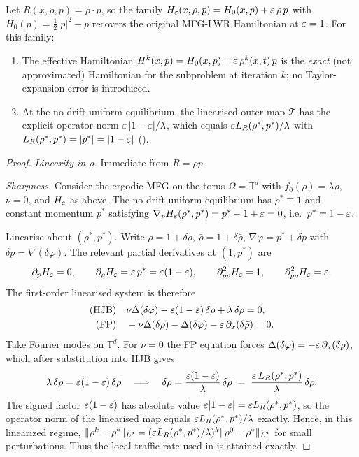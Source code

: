 \begin{proposition}
\label{prop:bilinear_exact}
Let $R(x,\rho,p) = \rho\cdot p$, so the family
$H_\varepsilon(x,\rho,p) = H_0(x,p) + \varepsilon\,\rho\, p$ with
$H_0(p) = \tfrac{1}{2}|p|^2 - p$ recovers the original MFG-LWR Hamiltonian
at $\varepsilon = 1$.  For this family:
\begin{enumerate}
  \item The effective Hamiltonian
        $H^k(x,p) = H_0(x,p) + \varepsilon\,\rho^k(x,t)\,p$
        is the \emph{exact} (not approximated) Hamiltonian for the
        subproblem at iteration $k$; no Taylor-expansion error is
        introduced.
  \item At the no-drift uniform equilibrium, the linearised outer map
        $\mathcal{T}$ has the explicit operator norm
        $\varepsilon\,|1-\varepsilon|/\lambda$, which equals
        $\varepsilon L_R(\rho^*,p^*)/\lambda$ with
        $L_R(\rho^*,p^*) = |p^*| = |1-\varepsilon|$ ().
\end{enumerate}
\end{proposition}
\begin{proof}
\textit{Linearity in $\rho$.} Immediate from $R = \rho p$.

\textit{Sharpness.}  Consider the ergodic MFG on the torus
$\Omega = \mathbb{T}^d$ with $f_0(\rho) = \lambda\rho$, $\nu = 0$, and
$H_\varepsilon$ as above.  The no-drift uniform equilibrium has
$\rho^* \equiv 1$ and constant momentum $p^*$ satisfying
$\nabla_p H_\varepsilon(\rho^*,p^*) = p^* - 1 + \varepsilon = 0$, i.e.\ $p^* = 1 - \varepsilon$.

Linearise about $(\rho^*,p^*)$.  Write $\rho = 1+\delta\rho$,
$\bar\rho = 1+\delta\bar\rho$, $\nabla\varphi = p^* + \delta p$ with
$\delta p = \nabla(\delta\varphi)$.  The relevant partial derivatives at
$(1,p^*)$ are
\[
  \partial_p H_\varepsilon = 0,\qquad
  \partial_\rho H_\varepsilon = \varepsilon\,p^* = \varepsilon(1-\varepsilon),\qquad
  \partial_{pp}^2 H_\varepsilon = 1,\qquad
  \partial_{p\rho}^2 H_\varepsilon = \varepsilon.
\]
The first-order linearised system is therefore
\begin{align*}
  \text{(HJB)}\quad &
  \nu\Delta(\delta\varphi) - \varepsilon(1-\varepsilon)\,\delta\bar\rho
  + \lambda\,\delta\rho = 0, \\
  \text{(FP)}\quad &
  -\nu\Delta(\delta\rho) - \Delta(\delta\varphi)
  - \varepsilon\,\partial_x(\delta\bar\rho) = 0.
\end{align*}
Take Fourier modes on $\mathbb{T}^d$.  For $\nu = 0$ the FP equation
forces $\Delta(\delta\varphi) = -\varepsilon\,\partial_x(\delta\bar\rho)$,
which after substitution into HJB gives
\[
  \lambda\,\delta\rho = \varepsilon(1-\varepsilon)\,\delta\bar\rho
  \quad\Longrightarrow\quad
  \delta\rho = \frac{\varepsilon(1-\varepsilon)}{\lambda}\,\delta\bar\rho
  \;=\; \frac{\varepsilon\,L_R(\rho^*,p^*)}{\lambda}\,\delta\bar\rho.
\]
The signed factor $\varepsilon(1-\varepsilon)$ has absolute value
$\varepsilon|1-\varepsilon| = \varepsilon L_R(\rho^*,p^*)$, so the operator norm of the
linearised map equals $\varepsilon L_R(\rho^*,p^*)/\lambda$ exactly.
Hence, in this linearized regime,
$\|\rho^k-\rho^*\|_{L^2} = (\varepsilon L_R(\rho^*,p^*)/\lambda)^k
\|\rho^0-\rho^*\|_{L^2}$ for small perturbations.  Thus the local
traffic rate used in  is attained exactly.
\end{proof}

